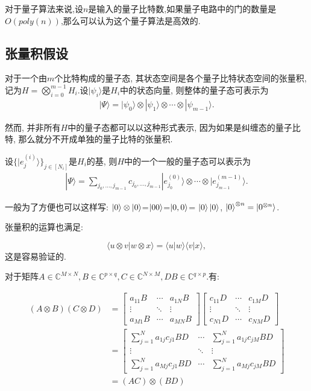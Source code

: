 对于量子算法来说,设$n$是输入的量子比特数,如果量子电路中的门的数量是$O(poly(n))$,那么可以认为这个量子算法是高效的.

\subsection{张量积假设}
对于一个由$m$个比特构成的量子态, 其状态空间是各个量子比特状态空间的张量积, 记为$H = \bigotimes_{i=0}^{m-1} H_i$.设$|\psi_i\rangle$是$H_i$中的状态向量, 则整体的量子态可表示为
\begin{align}
	|\Psi\rangle = |\psi_0\rangle \otimes |\psi_1\rangle \otimes \cdots \otimes |\psi_{m-1}\rangle.
\end{align}

然而, 并非所有$H$中的量子态都可以以这种形式表示, 因为如果是纠缠态的量子比特, 那么就分不开成单独的量子比特的张量积.\par 设$\{|e_j^{(i)}\rangle\}_{j\in[N_i]}$是$H_i$的基, 则$H$中的一个一般的量子态可以表示为
\begin{align}
	|\Psi\rangle = \sum_{j_0, \ldots, j_{m-1}} c_{j_0, \ldots, j_{m-1}} |e_{j_0}^{(0)}\rangle \otimes \cdots \otimes |e_{j_{m-1}}^{(m-1)}\rangle.
\end{align}

一般为了方便也可以这样写:  $\ket{0} \otimes \ket{0}$=$\ket{00}$=$\ket{0,0}$= $\ket{0}\ket{0}$, $\ket{0}^{\otimes n} = \ket{0^{\otimes n}}$.

张量积的运算也满足:

$$\langle u \otimes v | w \otimes x \rangle = \langle u | w \rangle \langle v | x \rangle,$$
这是容易验证的.

对于矩阵$A \in \mathbb{C}^{M\times N},B \in \mathbb{C}^{p\times q},C\in \mathbb{C}^{N\times M},DB \in \mathbb{C}^{q\times p}$.有:

\begin{spacing}{1.7}
\begin{align*}
	(A \otimes B)(C \otimes D) &= 
	\begin{bmatrix}
		a_{11}B & \cdots & a_{1N}B \\
		\vdots & \ddots & \vdots \\
		a_{M1}B & \cdots & a_{MN}B
	\end{bmatrix}
	\begin{bmatrix}
		c_{11}D & \cdots & c_{1M}D \\
		\vdots & \ddots & \vdots \\
		c_{N1}D & \cdots & c_{NM}D
	\end{bmatrix} \\
	&= \begin{bmatrix}
		\sum_{j=1}^N a_{1j} c_{j1} BD & \cdots & \sum_{j=1}^N a_{1j}  c_{jM} BD \\
		\vdots & \ddots & \vdots \\
		\sum_{j=1}^N a_{Mj} c_{j1} BD & \cdots & \sum_{j=1}^N a_{Mj} c_{jM}  BD
	\end{bmatrix} \\
	&= (AC) \otimes (BD)
\end{align*}
\end{spacing}

